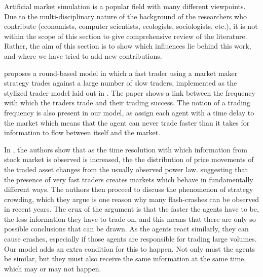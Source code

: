 \documentclass{article}
\begin{document}
Artificial market simulation is a popular field with many different viewpoints. Due to the multi-disciplinary nature of the background of the researchers who contribute (economists, computer scientists, ecologists, sociologists, etc.), it is not within the scope of this section to give  comprehensive review of the literature. Rather, the aim of this section is to show which influences lie behind this work, and where we have tried to add new contributions.

\cite{chiwang2013investigating} proposes a round-based model in which a fast trader using a market maker strategy trades against a large number of slow traders, implemented as the stylized trader model laid out in \cite{chiarella2009impact}. The paper shows a link between the frequency with which the traders trade and their trading success. The notion of a trading frequency is also present in our model, as assign each agent with a time delay to the market which means that the agent can never trade faster than it takes for information to flow between itself and the market.

In \cite{johnson2012financial}, the authors show that as the time resolution with which information from stock market is observed is increased, the the distribution of price movements of the traded asset changes from the usually observed power law.  suggesting that the presence of very fast traders creates markets which behave in fundamentally different ways. The authors then proceed to discuss the phenomenon of strategy crowding, which they argue is one reason why many flash-crashes can be observed in recent years. The crux of the argument is that the faster the agents have to be, the less information they have to trade on, and this means that there are only so possible conclusions that can be drawn. As the agents react similarly, they can cause crashes, especially if those agents are responsible for trading large volumes. Our model adds an extra condition for this to happen. Not only must the agents be similar, but they must also receive the same information at the same time, which may or may not happen.
\end{document}
